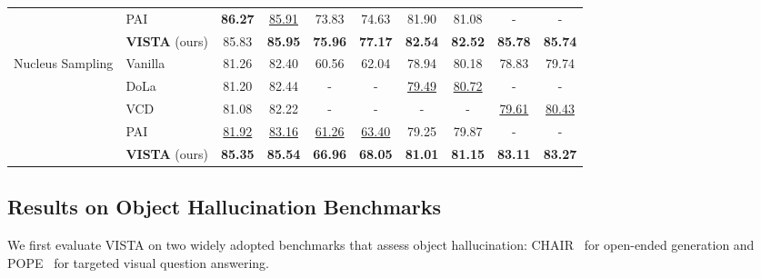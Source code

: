 \documentclass{article}
\newcommand{\ours}{{VISTA}\xspace}
\theoremstyle{plain}
\theoremstyle{definition}
\theoremstyle{remark}
\begin{document}
\begin{table}[t]
{\begin{tabular}{llcccccccc}
        & PAI~\cite{pai} & \bf 86.27 & \underline{85.91} & 73.83 & 74.63 & 81.90 & 81.08 & - & - \\
        & \cellcolor{lightgray}\textbf{\ours} (ours) & \cellcolor{lightgray}85.83 & \cellcolor{lightgray}\bf 85.95 &  \cellcolor{lightgray}\bf75.96 & \cellcolor{lightgray}\bf 77.17 & \cellcolor{lightgray}\bf 82.54 & \cellcolor{lightgray}\bf 82.52 & \cellcolor{lightgray}\bf 85.78 & \cellcolor{lightgray}\bf 85.74 \\
        \midrule
        \multirow{5}{*}{Nucleus Sampling} 
        & Vanilla & 81.26 & 82.40 & 60.56 & 62.04 & 78.94 & 80.18 & 78.83 & 79.74 \\
        & DoLa~\cite{dola} & 81.20 & 82.44 & - & - & \underline{79.49} & \underline{80.72} & - & - \\
        & VCD~\cite{vcd} & 81.08 & 82.22 & - & - & - & - & \underline{79.61} & \underline{80.43} \\
        & PAI~\cite{pai} & \underline{81.92} & \underline{83.16} & \underline{61.26} & \underline{63.40} & 79.25 & 79.87 & - & - \\
        & \cellcolor{lightgray}\textbf{\ours} (ours) & \cellcolor{lightgray}\bf 85.35 & \cellcolor{lightgray}\bf 85.54 & \cellcolor{lightgray}\bf 66.96 & \cellcolor{lightgray}\bf 68.05 & \cellcolor{lightgray}\bf 81.01 & \cellcolor{lightgray}\bf 81.15 & \cellcolor{lightgray}\bf 83.11 & \cellcolor{lightgray}\bf 83.27 \\
        \bottomrule
    \end{tabular}
    }
    \label{tab:pope}
    \vspace{-10pt}
\end{table}

\subsection{Results on Object Hallucination Benchmarks}
\label{sec:experiment-main-obj}
We first evaluate \ours on two widely adopted benchmarks that assess object hallucination: CHAIR~\cite{rohrbach2018object} for open-ended generation and POPE~\cite{rohrbach2018object} for targeted visual question answering.
\end{document}
